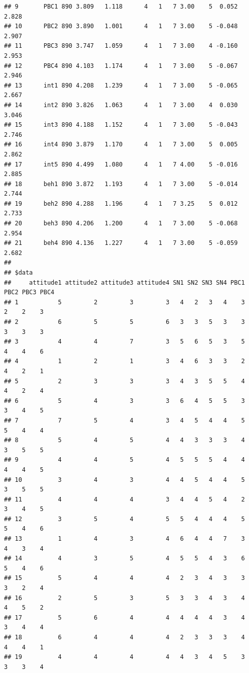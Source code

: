 \documentclass[
]{article}
\begin{document}
\begin{verbatim}
## 9       PBC1 890 3.809   1.118      4   1   7 3.00    5  0.052    2.828
## 10      PBC2 890 3.890   1.001      4   1   7 3.00    5 -0.048    2.907
## 11      PBC3 890 3.747   1.059      4   1   7 3.00    4 -0.160    2.953
## 12      PBC4 890 4.103   1.174      4   1   7 3.00    5 -0.067    2.946
## 13      int1 890 4.208   1.239      4   1   7 3.00    5 -0.065    2.667
## 14      int2 890 3.826   1.063      4   1   7 3.00    4  0.030    3.046
## 15      int3 890 4.188   1.152      4   1   7 3.00    5 -0.043    2.746
## 16      int4 890 3.879   1.170      4   1   7 3.00    5  0.005    2.862
## 17      int5 890 4.499   1.080      4   1   7 4.00    5 -0.016    2.885
## 18      beh1 890 3.872   1.193      4   1   7 3.00    5 -0.014    2.744
## 19      beh2 890 4.288   1.196      4   1   7 3.25    5  0.012    2.733
## 20      beh3 890 4.206   1.200      4   1   7 3.00    5 -0.068    2.954
## 21      beh4 890 4.136   1.227      4   1   7 3.00    5 -0.059    2.682
## 
## $data
##     attitude1 attitude2 attitude3 attitude4 SN1 SN2 SN3 SN4 PBC1 PBC2 PBC3 PBC4
## 1           5         2         3         3   4   2   3   4    3    2    2    3
## 2           6         5         5         6   3   3   5   3    3    3    3    3
## 3           4         4         7         3   5   6   5   3    5    4    4    6
## 4           1         2         1         3   4   6   3   3    2    4    2    1
## 5           2         3         3         3   4   3   5   5    4    4    2    4
## 6           5         4         3         3   6   4   5   5    3    3    4    5
## 7           7         5         4         3   4   5   4   4    5    5    4    4
## 8           5         4         5         4   4   3   3   3    4    3    5    5
## 9           4         4         5         4   5   5   5   4    4    4    4    5
## 10          3         4         3         4   4   5   4   4    5    3    5    5
## 11          4         4         4         3   4   4   5   4    2    3    4    5
## 12          3         5         4         5   5   4   4   4    5    5    4    6
## 13          1         4         3         4   6   4   4   7    3    4    3    4
## 14          4         3         5         4   5   5   4   3    6    5    4    6
## 15          5         4         4         4   2   3   4   3    3    3    2    4
## 16          2         5         3         5   3   3   4   3    4    4    5    2
## 17          5         6         4         4   4   4   4   3    4    3    4    4
## 18          6         4         4         4   2   3   3   3    4    4    4    1
## 19          4         4         4         4   4   3   4   5    3    3    3    4

\end{verbatim}
\end{document}
